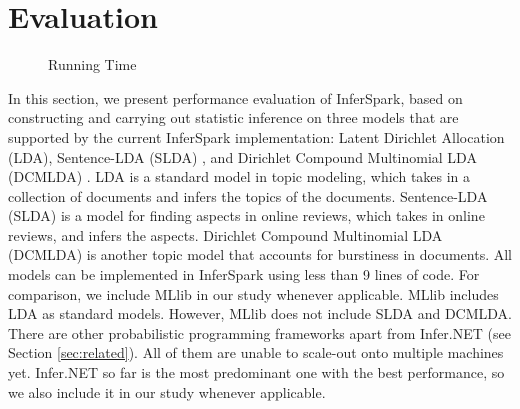 \section{Evaluation}
\label{sec:eval}

\begin{figure}
\centering
	\caption{Running Time}
    \label{fig:exp_comparison}
\end{figure} 

In this section, we present performance evaluation of InferSpark, 
based on constructing and carrying out statistic inference on three models that
are supported by the current InferSpark implementation: 
Latent Dirichlet Allocation (LDA), Sentence-LDA (SLDA) \cite{Jo2011}, and Dirichlet Compound Multinomial LDA (DCMLDA) \cite{Doyle2009}.
LDA is a standard model in topic modeling, which takes in a collection of documents
and infers the topics of the documents.  
Sentence-LDA (SLDA) is a model for finding aspects in online reviews, which takes in online reviews, and infers the aspects.
Dirichlet Compound Multinomial LDA (DCMLDA) is another topic model that accounts for burstiness in documents.
All models can be implemented in InferSpark using less than 9 lines of code. 
For comparison, we include MLlib in our study whenever applicable.
MLlib includes LDA as standard models.  However, MLlib does not include SLDA and DCMLDA.
There are other probabilistic programming frameworks apart from Infer.NET (see Section \ref{sec:related}).
All of them are unable to scale-out onto multiple machines yet.  
Infer.NET so far is the most predominant one with the best performance, so we also include it in our study whenever applicable.

